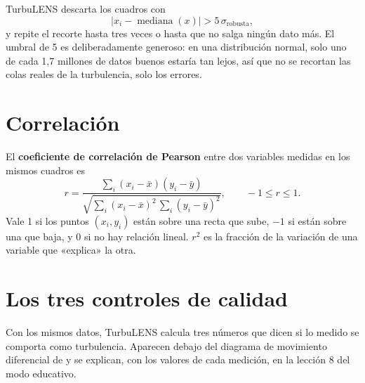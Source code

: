 TurbuLENS descarta los cuadros con
\begin{equation}
|x_i - \operatorname{mediana}(x)| > 5\,\sigma_\text{robusta} ,
\end{equation}
y repite el recorte hasta tres veces o hasta que no salga ningún dato más. El umbral de 5 es deliberadamente generoso:
en una distribución normal, solo uno de cada 1,7 millones de datos buenos estaría tan lejos, así que no se recortan las
colas reales de la turbulencia, solo los errores.

\section{Correlación}

El \textbf{coeficiente de correlación de Pearson} entre dos variables medidas en los mismos cuadros es
\begin{equation}
r = \frac{\sum_i (x_i - \bar x)(y_i - \bar y)}{\sqrt{\sum_i (x_i - \bar x)^2\,\sum_i (y_i - \bar y)^2}},\qquad -1\le r\le 1 .
\end{equation}
Vale 1 si los puntos $(x_i, y_i)$ están sobre una recta que sube, $-1$ si están sobre una que baja, y 0 si no hay
relación lineal. $r^2$ es la fracción de la variación de una variable que «explica» la otra.

\section{Los tres controles de calidad}\label{sec:controles}

Con los mismos datos, TurbuLENS calcula tres números que dicen si lo medido se comporta como turbulencia. Aparecen debajo
del diagrama de movimiento diferencial de  y se explican, con los valores de cada medición, en la lección 8
del modo educativo.


